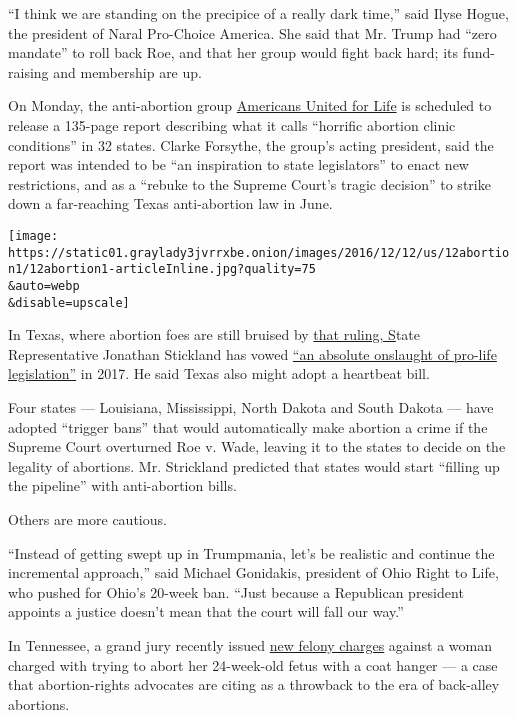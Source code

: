 ``I think we are standing on the precipice of a really dark time,'' said
Ilyse Hogue, the president of Naral Pro-Choice America. She said that
Mr. Trump had ``zero mandate'' to roll back Roe, and that her group
would fight back hard; its fund-raising and membership are up.

On Monday, the anti-abortion group \href{http://www.aul.org/}{Americans
United for Life} is scheduled to release a 135-page report describing
what it calls ``horrific abortion clinic conditions'' in 32 states.
Clarke Forsythe, the group's acting president, said the report was
intended to be ``an inspiration to state legislators'' to enact new
restrictions, and as a ``rebuke to the Supreme Court's tragic decision''
to strike down a far-reaching Texas anti-abortion law in June.

\texttt{[image: https://static01.graylady3jvrrxbe.onion/images/2016/12/12/us/12abortion1/12abortion1-articleInline.jpg?quality=75\\\&auto=webp\\\&disable=upscale]}

In Texas, where abortion foes are still bruised by
\href{https://www.nytimes3xbfgragh.onion/2016/06/28/us/supreme-court-texas-abortion.html}{that
ruling, S}tate Representative Jonathan Stickland has vowed
\href{https://www.texastribune.org/2016/06/27/whats-next-texas-abortion-restrictions/}{``an
absolute onslaught of pro-life legislation''} in 2017. He said Texas
also might adopt a heartbeat bill.

Four states --- Louisiana, Mississippi, North Dakota and South Dakota
--- have adopted ``trigger bans'' that would automatically make abortion
a crime if the Supreme Court overturned Roe v. Wade, leaving it to the
states to decide on the legality of abortions. Mr. Strickland predicted
that states would start ``filling up the pipeline'' with anti-abortion
bills.

Others are more cautious.

``Instead of getting swept up in Trumpmania, let's be realistic and
continue the incremental approach,'' said Michael Gonidakis, president
of Ohio Right to Life, who pushed for Ohio's 20-week ban. ``Just because
a Republican president appoints a justice doesn't mean that the court
will fall our way.''

In Tennessee, a grand jury recently issued
\href{http://www.nytimes3xbfgragh.onion/2016/11/29/us/tennessee-woman-accused-of-coat-hanger-abortion-faces-new-charges.html}{new
felony charges} against a woman charged with trying to abort her
24-week-old fetus with a coat hanger --- a case that abortion-rights
advocates are citing as a throwback to the era of back-alley abortions.

